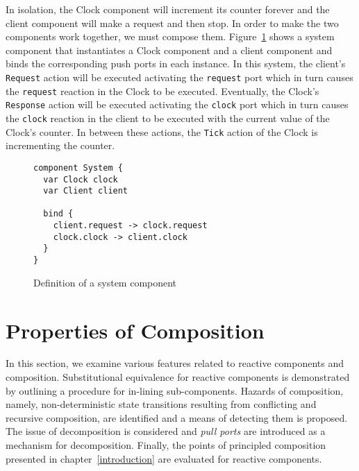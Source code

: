 In isolation, the Clock component will increment its counter forever and the client component will make a request and then stop.
In order to make the two components work together, we must compose them.
Figure~\ref{system_component} shows a system component that instantiates a Clock component and a client component and binds the corresponding push ports in each instance.
In this system, the client's \verb+Request+ action will be executed activating the \verb+request+ port which in turn causes the \verb+request+ reaction in the Clock to be executed.
Eventually, the Clock's \verb+Response+ action will be executed activating the \verb+clock+ port which in turn causes the \verb+clock+ reaction in the client to be executed with the current value of the Clock's counter.
In between these actions, the \verb+Tick+ action of the Clock is incrementing the counter.

\begin{figure}
\begin{verbatim}
component System {
  var Clock clock
  var Client client

  bind {
    client.request -> clock.request
    clock.clock -> client.clock
  }
}
\end{verbatim}
\caption{Definition of a system component\label{system_component}}
\end{figure}

\section{Properties of Composition\label{propcomp}}
In this section, we examine various features related to reactive components and composition.
Substitutional equivalence for reactive components is demonstrated by outlining a procedure for in-lining sub-components.
Hazards of composition, namely, non-deterministic state transitions resulting from conflicting and recursive composition, are identified and a means of detecting them is proposed.
The issue of decomposition is considered and \emph{pull ports} are introduced as a mechanism for decomposition.
Finally, the points of principled composition presented in chapter~\ref{introduction} are evaluated for reactive components.

